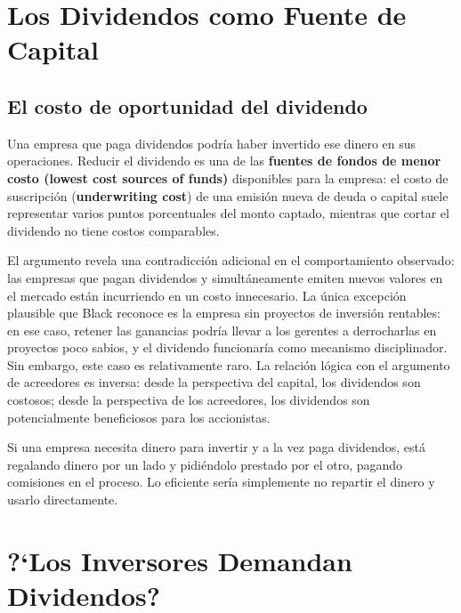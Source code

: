 \documentclass[12pt]{article}
\begin{document}
\section{Los Dividendos como Fuente de Capital}

\subsection{El costo de oportunidad del dividendo}

Una empresa que paga dividendos podr\'ia haber invertido ese dinero en sus operaciones. Reducir el dividendo es una de las \textbf{fuentes de fondos de menor costo (lowest cost sources of funds)} disponibles para la empresa: el costo de suscripci\'on (\textbf{underwriting cost}) de una emisi\'on nueva de deuda o capital suele representar varios puntos porcentuales del monto captado, mientras que cortar el dividendo no tiene costos comparables.

\begin{explicacion}
El argumento revela una contradicci\'on adicional en el comportamiento observado: las empresas que pagan dividendos y simultáneamente emiten nuevos valores en el mercado est\'an incurriendo en un costo innecesario. La \'unica excepci\'on plausible que Black reconoce es la empresa sin proyectos de inversi\'on rentables: en ese caso, retener las ganancias podr\'ia llevar a los gerentes a derrocharlas en proyectos poco sabios, y el dividendo funcionar\'ia como mecanismo disciplinador. Sin embargo, este caso es relativamente raro. La relaci\'on l\'ogica con el argumento de acreedores es inversa: desde la perspectiva del capital, los dividendos son costosos; desde la perspectiva de los acreedores, los dividendos son potencialmente beneficiosos para los accionistas.
\end{explicacion}

\begin{intuicion}
Si una empresa necesita dinero para invertir y a la vez paga dividendos, est\'a regalando dinero por un lado y pidi\'endolo prestado por el otro, pagando comisiones en el proceso. Lo eficiente ser\'ia simplemente no repartir el dinero y usarlo directamente.
\end{intuicion}

\section{?`Los Inversores Demandan Dividendos?}
\end{document}

